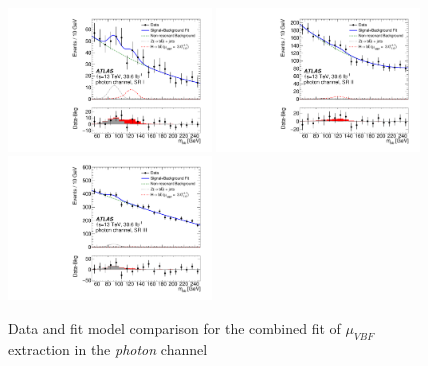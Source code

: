 \begin{figure}[htbp]
\centering

\includegraphics[width=0.48\textwidth]{figures/VBF/comb_vbfonly_testchannel1_vbfg.pdf}
\includegraphics[width=0.48\textwidth]{figures/VBF/comb_vbfonly_testchannel2_vbfg.pdf}
\includegraphics[width=0.48\textwidth]{figures/VBF/comb_vbfonly_testchannel3_vbfg.pdf}
\caption{Data and fit model comparison for the combined fit of $\mu_{VBF}$ extraction in the \textit{photon} channel}
\label{fig:mbb_postfit_photon}
\end{figure}


